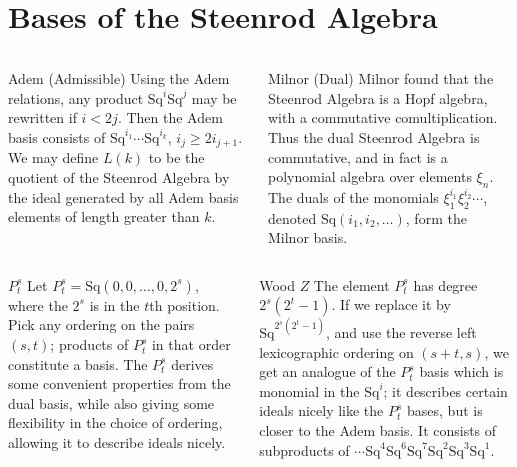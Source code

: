 \documentclass[final]{beamer}
\newcommand{\Sq}{\mathrm{Sq}}
\begin{document}
\begin{columns}[T]
\begin{column}{0.495\textwidth}
      \section{Bases of the Steenrod Algebra}
      \begin{columns}[T]
        \begin{column}{0.497\textwidth}
          \begin{block}{Adem (Admissible)}
            Using the Adem relations, any product $\Sq^i\Sq^j$ may be rewritten if $i<2j$.  Then the \alert{Adem basis} consists of $\Sq^{i_1}\cdots\Sq^{i_k}$, $i_j \geq 2i_{j+1}$.
            We may define \alert{$L(k)$} to be the quotient of the Steenrod Algebra by the ideal generated by all Adem basis elements of length greater than $k$.
          \end{block}
        \end{column}
        \begin{column}{0.497\textwidth}
          \begin{block}{Milnor (Dual)}
            Milnor found that the Steenrod Algebra is a Hopf algebra, with a commutative comultiplication.  Thus the dual Steenrod Algebra is commutative, and in fact is a polynomial algebra over elements $\xi_n$.  The duals of the monomials $\xi_1^{i_1}\xi_2^{i_2}\cdots$, denoted $\Sq(i_1,i_2,\ldots)$, form the \alert{Milnor basis}.
          \end{block}
        \end{column}
      \end{columns}
      \vspace{0.2em}
      \begin{columns}[T]
        \begin{column}{0.497\textwidth}
          \begin{block}{$P^s_t$}
            Let $P^s_t=\Sq(0,0,\ldots,0,2^s)$, where the $2^s$ is in the $t$th position.  Pick any ordering on the pairs $(s,t)$; products of $P^s_t$ in that order constitute a basis.  The $P^s_t$ derives some convenient properties from the dual basis, while also giving some flexibility in the choice of ordering, allowing it to describe ideals nicely.
          \end{block}
        \end{column}
        \begin{column}{0.497\textwidth}
          \begin{block}{Wood $Z$}
            The element $P^s_t$ has degree $2^s(2^t-1)$.  If we replace it by $\Sq^{2^s(2^t-1)}$, and use the reverse left lexicographic ordering on $(s + t,s)$, we get an analogue of the $P^s_t$ basis which is monomial in the $\Sq^i$; it describes certain ideals nicely like the $P^s_t$ bases, but is closer to the Adem basis.  It consists of subproducts of $\cdots\Sq^4\Sq^6\Sq^7\Sq^2\Sq^3\Sq^1$.

\end{block}
\end{column}
\end{columns}
\end{column}
\end{columns}
\end{document}
